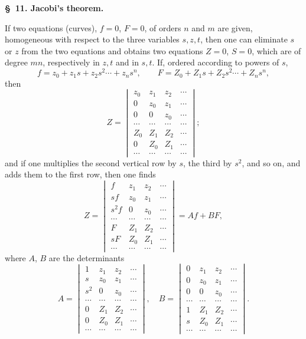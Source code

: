 \documentclass[10pt]{article}
\begin{document}
\begin{center}
{\bfseries \S\ 11. Jacobi's theorem.}
\end{center}

If two equations (curves), $f=0$, $F=0$, of orders $n$ and $m$ are given, homogeneous with respect to the three variables $s,z,t$, then one can eliminate $s$ or $z$ from the two equations and obtains two equations $Z=0$, $S=0$, which are of degree $mn$, respectively in $z,t$ and in $s,t$. If, ordered according to powers of $s$,
\[
f=z_0+z_1s+z_2s^2\cdots+z_ns^n,
\qquad
F=Z_0+Z_1s+Z_2s^2\cdots+Z_ns^n,
\]
then
\[
Z=\begin{vmatrix}
z_0&z_1&z_2&\cdots\\
0&z_0&z_1&\cdots\\
0&0&z_0&\cdots\\
\cdots&\cdots&\cdots&\cdots\\
Z_0&Z_1&Z_2&\cdots\\
0&Z_0&Z_1&\cdots\\
\cdots&\cdots&\cdots&\cdots
\end{vmatrix};
\]
and if one multiplies the second vertical row by $s$, the third by $s^2$, and so on, and adds them to the first row, then one finds
\[
Z=\begin{vmatrix}
f&z_1&z_2&\cdots\\
sf&z_0&z_1&\cdots\\
s^2f&0&z_0&\cdots\\
\cdots&\cdots&\cdots&\cdots\\
F&Z_1&Z_2&\cdots\\
sF&Z_0&Z_1&\cdots\\
\cdots&\cdots&\cdots&\cdots
\end{vmatrix}=Af+BF,
\]
where $A$, $B$ are the determinants
\[
A=\begin{vmatrix}
1&z_1&z_2&\cdots\\
s&z_0&z_1&\cdots\\
s^2&0&z_0&\cdots\\
\cdots&\cdots&\cdots&\cdots\\
0&Z_1&Z_2&\cdots\\
0&Z_0&Z_1&\cdots\\
\cdots&\cdots&\cdots&\cdots
\end{vmatrix},\quad
B=\begin{vmatrix}
0&z_1&z_2&\cdots\\
0&z_0&z_1&\cdots\\
0&0&z_0&\cdots\\
\cdots&\cdots&\cdots&\cdots\\
1&Z_1&Z_2&\cdots\\
s&Z_0&Z_1&\cdots\\
\cdots&\cdots&\cdots&\cdots
\end{vmatrix}.
\]
\end{document}
